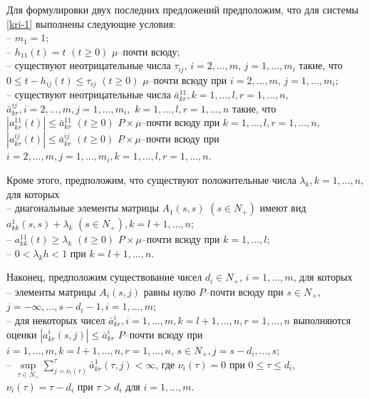 Для формулировки двух последних предложений предположим, что для
системы \eqref{kri-1} выполнены следующие условия:\\
\noindent
  -- $m_1 =1$;\\
  -- $h_{11}(t) = t \,\, (t \geq 0)$ $\mu $--почти всюду;\\
  -- существуют неотрицательные числа $\tau_{ij}$, $i =
2,...,m$, $j = 1,...,m_i$  такие, что
 $0 \leq t- h_{ij}(t)
\leq \tau _{ij} {\,} {\,} (t \geq 0)$ $\mu $--почти всюду при $i =
2,...,m$, $j = 1,...,m_i$;\\
-- существуют неотрицательные числа
  $\bar a^{11}_{kr},  k =1,...,l, r =
1,...,n$, $\bar a^{ij}_{kr}, i = 2,...,m, j = 1,...,m_i,$ $k =1,...,l,
r = 1,...,n$  такие, что $|a^{11}_{kr}(t)|\leq \bar a^{11}_{kr} \,\,
(t\geq 0) $ $P\times\mu$--почти всюду при $k =1,...,l, r = 1,...,n$,
$|a^{ij}_{kr}(t)|\leq \bar a^{ij}_{kr} \,\, (t\geq 0) $
$P\times\mu$--почти всюду при $i = 2, ..., m, j = 1,...,m_i, k
=1,...,l, r = 1,...,n$.

Кроме этого, предположим, что существуют положительные числа
$\lambda _k, k = 1, ..., n$, для которых\\
\noindent
  -- диагональные элементы
матрицы $ A_1(s,s)$ $(s \in N_+)$ имеют вид $a_{kk}^{1}(s,s) +
\lambda _k \,\, (s \in N_+), k=l + 1, ..., n$;\\
-- $a^{11}_{kk}(t)  \geq
\lambda _k \,\, (t\geq 0)$ $P\times\mu$--почти всюду при $k =
1,...,l$;\\
 -- $0 < \lambda _kh < 1$ при $ k = l + 1, ..., n$.

Наконец, предположим существование чисел $d_i \in N_+$, $i =
1,...,m$, для которых\\
\noindent
 -- элементы матрицы $A_i(s,j)$ равны нулю
$P$--почти всюду при $s \in N_+$, $j=-\infty,...,s-d_i-1,
i=1,...,m$;\\
-- для некоторых чисел $\bar a^i_{kr},i=1,...,m, k = l+1, ..., n, r =
1,...,n$ выполняются оценки $|a^i_{kr}(s,j)| \leq \bar a^i_{kr}$
$P$--почти всюду при $i=1,...,m, k = l+1, ..., n, r = 1,...,n$, $s
\in N_+, j = s - d_i, ..., s$;\\
-- $\mathrel {\mathop {\sup} \limits _{\tau \in N_+}}\sum
\limits _{j=\nu _i (\tau)}^{\tau}\bar a^{1}_{kr}(\tau,j) < \infty $,
где $\nu _i (\tau) = 0$ при $0 \le \tau \le d_i$, $\nu _i (\tau) =
\tau - d_i$ при $\tau > d_i$ для $i= 1,...,m$.

